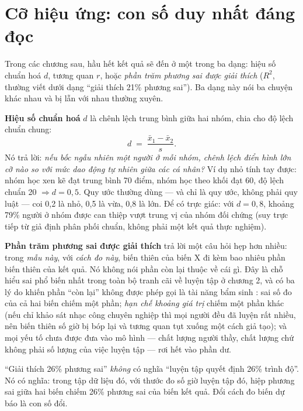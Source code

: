 \documentclass[../hieu-suat.tex]{subfiles}
\begin{document}
\section{Cỡ hiệu ứng: con số duy nhất đáng đọc}

Trong các chương sau, hầu hết kết quả sẽ đến ở một trong ba dạng: hiệu số chuẩn hoá \(d\), tương quan \(r\), hoặc \emph{phần trăm phương sai được giải thích} (\(R^2\), thường viết dưới dạng ``giải thích 21\% phương sai''). Ba dạng này nói ba chuyện khác nhau và bị lẫn với nhau thường xuyên.

\textbf{Hiệu số chuẩn hoá} \(d\) là chênh lệch trung bình giữa hai nhóm, chia cho độ lệch chuẩn chung:
\[
d \;=\; \frac{\bar{x}_1 - \bar{x}_2}{s}.
\]
Nó trả lời: \emph{nếu bốc ngẫu nhiên một người ở mỗi nhóm, chênh lệch điển hình lớn cỡ nào so với mức dao động tự nhiên giữa các cá nhân?} Ví dụ nhỏ tính tay được: nhóm học xen kẽ đạt trung bình 70 điểm, nhóm học theo khối đạt 60, độ lệch chuẩn 20 \(\Rightarrow d = 0{,}5\). Quy ước thường dùng --- và chỉ là quy ước, không phải quy luật --- coi 0{,}2 là nhỏ, 0{,}5 là vừa, 0{,}8 là lớn. Để có trực giác: với \(d = 0{,}8\), khoảng 79\% người ở nhóm được can thiệp vượt trung vị của nhóm đối chứng \nM{} (suy trực tiếp từ giả định phân phối chuẩn, không phải một kết quả thực nghiệm).

\textbf{Phần trăm phương sai được giải thích} trả lời một câu hỏi hẹp hơn nhiều: trong \emph{mẫu này}, với \emph{cách đo này}, biến thiên của biến X đi kèm bao nhiêu phần biến thiên của kết quả. Nó không nói phần còn lại thuộc về cái gì. Đây là chỗ hiểu sai phổ biến nhất trong toàn bộ tranh cãi về luyện tập ở chương 2, và có ba lý do khiến phần ``còn lại'' không được phép gọi là tài năng bẩm sinh \nM{}: sai số đo của cả hai biến chiếm một phần; \emph{hạn chế khoảng giá trị} chiếm một phần khác (nếu chỉ khảo sát nhạc công chuyên nghiệp thì mọi người đều đã luyện rất nhiều, nên biến thiên số giờ bị bóp lại và tương quan tụt xuống một cách giả tạo); và mọi yếu tố chưa được đưa vào mô hình --- chất lượng người thầy, chất lượng chứ không phải số lượng của việc luyện tập --- rơi hết vào phần dư.

\begin{cambay}
``Giải thích 26\% phương sai'' \emph{không} có nghĩa ``luyện tập quyết định 26\% trình độ''. Nó có nghĩa: trong tập dữ liệu đó, với thước đo số giờ luyện tập đó, hiệp phương sai giữa hai biến chiếm 26\% phương sai của biến kết quả. Đổi cách đo biến dự báo là con số đổi.
\end{cambay}
\end{document}
